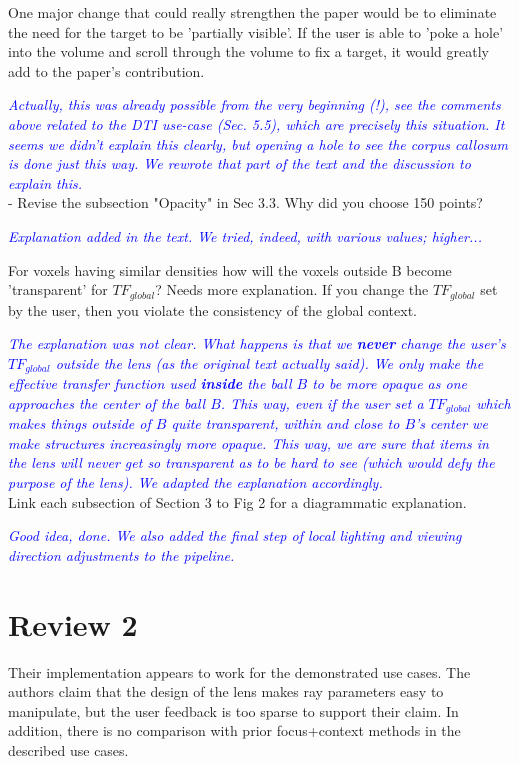 \documentclass[a4paper,10pt]{article}
\newcommand{\rr}[1]{\emph{\textcolor{blue}{#1}}}
\begin{document}
    One major change that could really strengthen the paper would be to eliminate the
    need for the target to be 'partially visible'. If the user is able to 'poke a
    hole' into the volume and scroll through the volume to fix a target, it would
    greatly add to the paper's contribution.
    
    \rr{Actually, this was already possible from the very beginning (!), see the comments above related to the DTI use-case (Sec. 5.5), which are precisely this situation. It seems we didn't explain this clearly, but opening a hole to see the corpus callosum is done just this way. We rewrote that part of the text and the discussion to explain this.}\\
    
    - Revise the subsection "Opacity" in Sec 3.3. Why did you choose 150 points? 
    
    \rr{Explanation added in the text. We tried, indeed, with various values; higher...}
    
    For voxels having similar densities how will the voxels outside B become 'transparent'
    for $TF_{global}$? Needs more explanation. If you change the $TF_{global}$ set by the
    user, then you violate the consistency of the global context.
    
    \rr{The explanation was not clear. What happens is that we \textbf{never} change the user's $TF_{global}$ outside the lens (as the original text actually said). We only make the effective transfer function used \textbf{inside} the ball $B$ to be more opaque as one approaches the center of the ball $B$. This way, even if the user set a $TF_{global}$ which makes things outside of $B$ quite transparent, within and close to $B$'s center we make structures increasingly more opaque. This way, we are sure that items in the lens will never get so transparent as to be hard to see (which would defy the purpose of the lens). We adapted the explanation accordingly.}\\

    Link each subsection of Section 3 to Fig 2 for a diagrammatic explanation.
    
    \rr{Good idea, done. We also added the final step of local lighting and viewing direction adjustments to the pipeline.} 

\section{Review 2}

    Their implementation appears to work for the demonstrated use cases. The authors
    claim that the design of the lens makes ray parameters easy to manipulate, but the
    user feedback is too sparse to support their claim. In addition, there is no
    comparison with prior focus+context methods in the described use cases.
    
\end{document}
